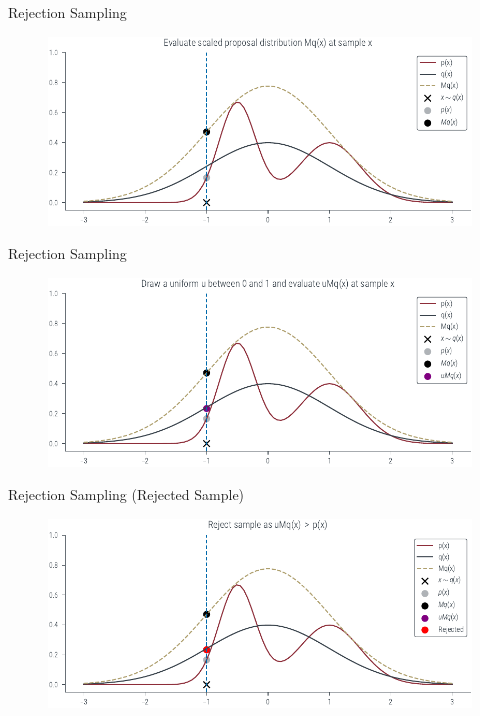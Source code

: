 \documentclass{beamer}
\begin{document}
    \begin{frame}{Rejection Sampling}
        \begin{figure}
            \centering
            \includegraphics[scale = 0.75]{../figures/sampling/rejection-sampling--1.0-True-True-True-True-True-True-False-False.pdf}
        \end{figure}
    \end{frame}

    \begin{frame}{Rejection Sampling}
        \begin{figure}
            \centering
            \includegraphics[scale = 0.75]{../figures/sampling/rejection-sampling--1.0-True-True-True-True-True-True-True-False.pdf}
        \end{figure}
    \end{frame}

    \begin{frame}{Rejection Sampling (Rejected Sample)}
        \begin{figure}
            \centering
            \includegraphics[scale = 0.75]{../figures/sampling/rejection-sampling--1.0-True-True-True-True-True-True-True-True.pdf}
        \end{figure}
    \end{frame}
\end{document}
